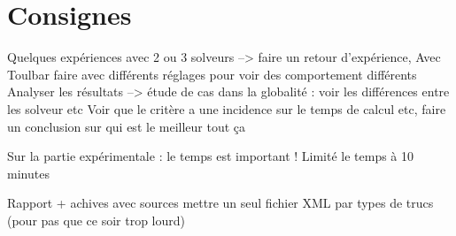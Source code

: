 \documentclass[a4paper, 10pt]{article}
\begin{document}
  \section{Consignes}

    Quelques expériences avec 2 ou 3 solveurs --> faire un retour d'expérience,
    Avec Toulbar faire avec différents réglages pour voir des comportement différents
    Analyser les résultats --> étude de cas dans la globalité : voir les différences entre les solveur etc Voir que le critère a une incidence sur le temps de calcul etc, faire un conclusion sur qui est le meilleur tout ça

    Sur la partie expérimentale : le temps est important ! Limité le temps à 10 minutes

    Rapport + achives avec sources mettre un seul fichier XML par types de trucs (pour pas que ce soir trop lourd)
\end{document}
